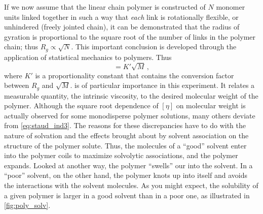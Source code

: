 If we now assume that the linear chain polymer is constructed of \( N \) monomer units linked together in such a way that \emph{each} link is rotationally flexible, or unhindered (freely jointed chain), it can be demonstrated that the radius of gyration is proportional to the square root of the number of links in the polymer chain; thus \( R_g \propto \sqrt{N} \). 
This important conclusion is developed through the application of statistical mechanics to polymers.\autocite{halpern97} Thus
\begin{equation}
	[\eta] = K' \sqrt{M} \, ,
	\label{eq:staud_ind3}
\end{equation}
where \( K' \) is a proportionality constant that contains the conversion factor between \( R_g \) and \( \sqrt{M} \). 
 is of particular importance in this experiment. 
It relates a measurable quantity, the intrinsic viscosity, to the desired molecular weight of the polymer. Although the square root dependence of \( [\eta] \) on molecular weight is actually observed for some monodisperse polymer solutions, many others deviate from \cref{eq:staud_ind3}. 
The reasons for these discrepancies have to do with the nature of solvation and the effects brought about by solvent association on the structure of the polymer solute. 
Thus, the molecules of a ``good'' solvent enter into the polymer coils to maximize solvolytic associations, and the polymer expands. 
Looked at another way, the polymer ``swells'' our into the solvent. 
In a ``poor'' solvent, on the other hand, the polymer knots up into itself and avoids the interactions with the solvent molecules. 
As you might expect, the solubility of a given polymer is larger in a good solvent than in a poor one, as illustrated in \cref{fig:poly_solv}. 

